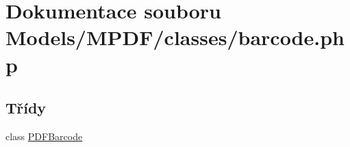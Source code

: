 \hypertarget{barcode_8php}{\section{Dokumentace souboru Models/\-M\-P\-D\-F/classes/barcode.php}
\label{barcode_8php}
}
\subsection*{Třídy}
\begin{DoxyCompactItemize}
\item 
class \hyperlink{class_p_d_f_barcode}{P\-D\-F\-Barcode}
\end{DoxyCompactItemize}
